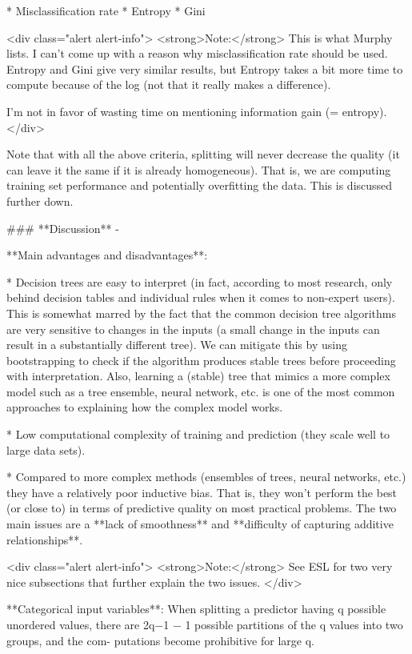 * Misclassification rate
* Entropy
* Gini

<div class="alert alert-info">
  <strong>Note:</strong> This is what Murphy lists. I can't come up with a reason why misclassification rate should be used. Entropy and Gini give very similar results, but Entropy takes a bit more time to compute because of the log (not that it really makes a difference).
  
I'm not in favor of wasting time on mentioning information gain (= entropy).
</div>  

Note that with all the above criteria, splitting will never decrease the quality (it can leave it the same if it is already homogeneous). That is, we are computing training set performance and potentially overfitting the data. This is discussed further down.

### **Discussion** {-}

**Main advantages and disadvantages**:

* Decision trees are easy to interpret (in fact, according to most research, only behind decision tables and individual rules when it comes to non-expert users). This is somewhat marred by the fact that the common decision tree algorithms are very sensitive to changes in the inputs (a small change in the inputs can result in a substantially different tree). We can mitigate this by using bootstrapping to check if the algorithm produces stable trees before proceeding with interpretation. Also, learning a (stable) tree that mimics a more complex model such as a tree ensemble, neural network, etc. is one of the most common approaches to explaining how the complex model works.

* Low computational complexity of training and prediction (they scale well to large data sets).

* Compared to more complex methods (ensembles of trees, neural networks, etc.) they have a relatively poor inductive bias. That is, they won't perform the best (or close to) in terms of predictive quality on most practical problems. The two main issues are a **lack of smoothness** and **difficulty of capturing additive relationships**.

<div class="alert alert-info">
  <strong>Note:</strong> See ESL for two very nice subsections that further explain the two issues.
</div>  

**Categorical input variables**: When splitting a predictor having q possible unordered values, there are 2q−1 − 1 possible partitions of the q values into two groups, and the com-
putations become prohibitive for large q. 

